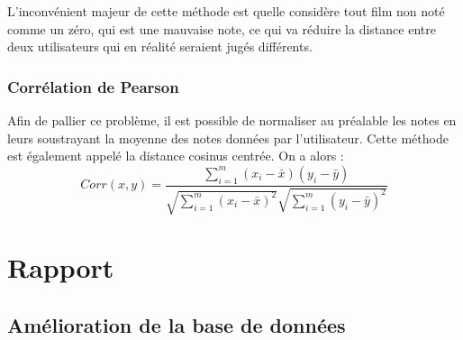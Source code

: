 \documentclass{report}
\begin{document}
L'inconvénient majeur de cette méthode est quelle considère tout film non noté comme un zéro, qui est une mauvaise note, ce qui va réduire la distance entre deux utilisateurs qui en réalité seraient jugés différents.

\subsection{Corrélation de Pearson}
Afin de pallier ce problème, il est possible de normaliser au préalable les notes en leurs soustrayant la moyenne des notes données par l'utilisateur. Cette méthode est également appelé la distance cosinus centrée.
On a alors :
\begin{equation}
  Corr(x, y) = \frac{\sum_{i=1}^m (x_i - \bar{x})(y_i - \bar{y})}{\sqrt{\sum_{i=1}^m (x_i - \bar{x})^2}\sqrt{\sum_{i=1}^m (y_i - \bar{y})^2}}
\end{equation}











\chapter{Rapport}

\section{Amélioration de la base de données}
\end{document}
